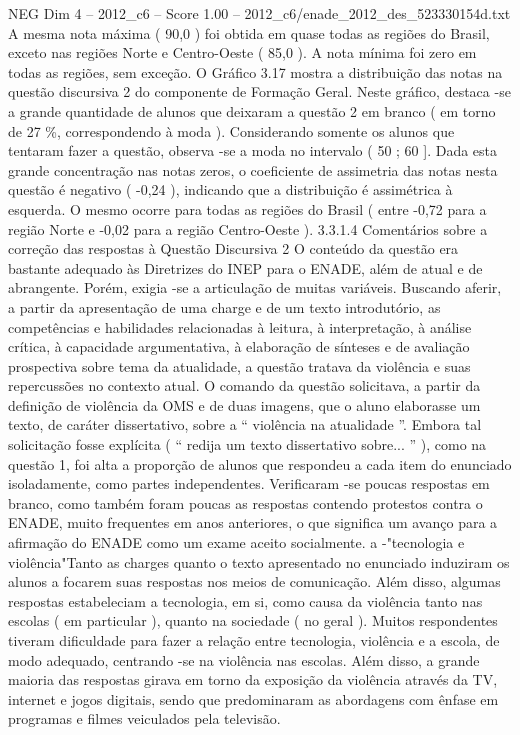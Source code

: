 \begin{textsample}{NEG Dim 4 – 2012\_c6 – Score 1.00 – 2012\_c6/enade\_2012\_des\_523330154d.txt}
A mesma nota máxima ( 90,0 ) foi obtida em quase todas as regiões do Brasil, exceto nas regiões Norte e Centro-Oeste ( 85,0 ).
A nota mínima foi zero em todas as regiões, sem exceção.
O Gráfico 3.17 mostra a distribuição das notas na questão discursiva 2 do componente de Formação Geral.
Neste gráfico, destaca -se a grande quantidade de alunos que deixaram a questão 2 em branco ( em torno de 27 \%, correspondendo à moda ).
Considerando somente os alunos que tentaram fazer a questão, observa -se a moda no intervalo ( 50 ; 60 ].
Dada esta grande concentração nas notas zeros, o coeficiente de assimetria das notas nesta questão é negativo ( -0,24 ), indicando que a distribuição é assimétrica à esquerda.
O mesmo ocorre para todas as regiões do Brasil ( entre -0,72 para a região Norte e -0,02 para a região Centro-Oeste ). 3.3.1.4 Comentários sobre a correção das respostas à Questão Discursiva 2 O conteúdo da questão era bastante adequado às Diretrizes do INEP para o ENADE, além de atual e de abrangente.
Porém, exigia -se a articulação de muitas variáveis.
Buscando aferir, a partir da apresentação de uma charge e de um texto introdutório, as competências e habilidades relacionadas à leitura, à interpretação, à análise crítica, à capacidade argumentativa, à elaboração de sínteses e de avaliação prospectiva sobre tema da atualidade, a questão tratava da violência e suas repercussões no contexto atual.
O comando da questão solicitava, a partir da definição de violência da OMS e de duas imagens, que o aluno elaborasse um texto, de caráter dissertativo, sobre a “ violência na atualidade ”.
Embora tal solicitação fosse explícita ( “ redija um texto dissertativo sobre... ” ), como na questão 1, foi alta a proporção de alunos que respondeu a cada item do enunciado isoladamente, como partes independentes.
Verificaram -se poucas respostas em branco, como também foram poucas as respostas contendo protestos contra o ENADE, muito frequentes em anos anteriores, o que significa um avanço para a afirmação do ENADE como um exame aceito socialmente. a -"tecnologia e violência"Tanto as charges quanto o texto apresentado no enunciado induziram os alunos a focarem suas respostas nos meios de comunicação.
Além disso, algumas respostas estabeleciam a tecnologia, em si, como causa da violência tanto nas escolas ( em particular ), quanto na sociedade ( no geral ).
Muitos respondentes tiveram dificuldade para fazer a relação entre tecnologia, violência e a escola, de modo adequado, centrando -se na violência nas escolas.
Além disso, a grande maioria das respostas girava em torno da exposição da violência através da TV, internet e jogos digitais, sendo que predominaram as abordagens com ênfase em programas e filmes veiculados pela televisão.

\end{textsample}
